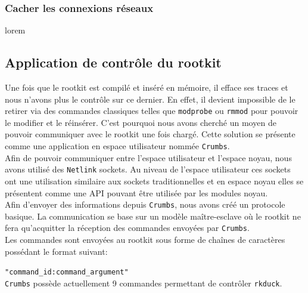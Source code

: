 \documentclass[11pt]{article}
\begin{document}
            
        \subsubsection{Cacher les connexions réseaux}
        \label{sec:ip}
            lorem
            
    \subsection{Application de contrôle du rootkit}
    \label{sec:crumb}
        

        Une fois que le rootkit est compilé et inséré en mémoire, il efface ses traces et nous n'avons plus le contrôle sur ce dernier. En effet, il devient impossible de le retirer via des commandes classiques telles que \texttt{modprobe} ou \texttt{rmmod} pour pouvoir le modifier et le réinsérer. C'est pourquoi nous avons cherché un moyen de pouvoir communiquer avec le rootkit une fois chargé. Cette solution se présente comme une application en espace utilisateur nommée \texttt{Crumbs}. \\

        Afin de pouvoir communiquer entre l'espace utilisateur et l'espace noyau, nous avons utilisé des \texttt{Netlink} sockets. Au niveau de l'espace utilisateur ces sockets ont une utilisation similaire aux sockets traditionnelles et en espace noyau elles se présentent comme une API pouvant être utilisée par les modules noyau. \\

        Afin d'envoyer des informations depuis \texttt{Crumbs}, nous avons créé un protocole basique. La communication se base sur un modèle maître-esclave où le rootkit ne fera qu'acquitter la réception des commandes envoyées par \texttt{Crumbs}. \\
        Les commandes sont envoyées au rootkit sous forme de chaînes de caractères possédant le format suivant:

        \texttt{"command\_id:command\_argument"}\\

        \texttt{Crumbs} possède actuellement 9 commandes permettant de contrôler \texttt{rkduck}.
\end{document}
